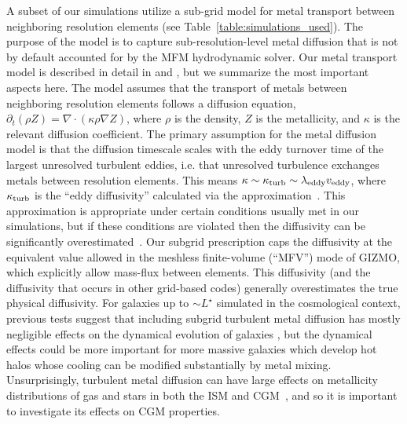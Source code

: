 \documentclass[fleqn,usenatbib]{mnras}
\begin{document}
A subset of our simulations utilize a sub-grid model for metal transport between neighboring resolution elements (see Table~\ref{table:simulations_used}).
The purpose of the model is to capture sub-resolution-level metal diffusion that is not by default accounted for by the MFM hydrodynamic solver. 
Our metal transport model is described in detail in \cite{Hopkins2017a} and \cite{Hopkins2017}, but we summarize the most important aspects here.
The model assumes that the transport of metals between neighboring resolution elements follows a diffusion equation, $\partial_t ( \rho Z ) = \nabla \cdot ( \kappa \rho \nabla Z ) $, where $\rho$ is the density, $Z$ is the metallicity, and $\kappa$ is the relevant diffusion coefficient.
The primary assumption for the metal diffusion model is that the diffusion timescale scales with the eddy turnover time of the largest unresolved turbulent eddies, i.e. that unresolved turbulence exchanges metals between resolution elements.
This means $\kappa \sim \kappa_{\rm turb} \sim \lambda_{\rm eddy} v_{\rm eddy}$, where $\kappa_{\rm turb}$ is the ``eddy diffusivity'' calculated via the \cite{Smagorinsky1963} approximation~\citep[e.g.][]{Shen2010}.
This approximation is appropriate under certain conditions usually met in our simulations, but if these conditions are violated then the diffusivity can be significantly overestimated~\citep[e.g.][]{Colbrook2017}.
Our subgrid prescription caps the diffusivity at the equivalent value allowed in the meshless finite-volume (``MFV'') mode of GIZMO, which explicitly allow mass-flux between elements. 
This diffusivity (and the diffusivity that occurs in other grid-based codes) generally overestimates the true physical diffusivity. 
For galaxies up to $\sim L^{\star}$ simulated in the cosmological context, previous tests suggest that including subgrid turbulent metal diffusion has mostly negligible effects on the dynamical evolution of galaxies \citep[e.g.,][]{Su2016}, but the dynamical effects could be more important for more massive galaxies which develop hot halos whose cooling can be modified substantially by metal mixing. 
Unsurprisingly, turbulent metal diffusion can have large effects on metallicity distributions of gas and stars in both the ISM and CGM~\citep[e.g.,][]{Escala2018, Rennehan2018}, and so it is important to investigate its effects on CGM properties.
\end{document}
